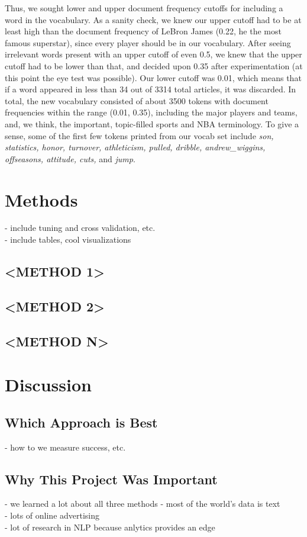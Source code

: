 \documentclass[11pt]{article}
\begin{document}
Thus, we sought lower and upper document frequency cutoffs for including a word in the vocabulary.  As a sanity check, we knew our upper cutoff had to be at least high than the document frequency of LeBron James (0.22, he the most famous superstar), since every player should be in our vocabulary. After seeing irrelevant words present with an upper cutoff of even 0.5, we knew that the upper cutoff had to be lower than that, and decided upon 0.35 after experimentation (at this point the eye test was possible). Our lower cutoff was 0.01, which means that if a word appeared in less than 34 out of 3314 total articles, it was discarded.  In total, the new vocabulary consisted of about 3500 tokens with document frequencies within the range (0.01, 0.35), including the major players and teams, and, we think, the important, topic-filled sports and NBA terminology. To give a sense, some of the first few tokens printed from our vocab set include \textit{son, statistics, honor, turnover, athleticism, pulled, dribble, andrew\_wiggins, offseasons, attitude, cuts,} and \textit{jump}.  


\section{Methods}
- include tuning and cross validation, etc. \\
- include tables, cool visualizations \\

\subsection{<METHOD 1>}

\subsection{<METHOD 2>}

\subsection{<METHOD N>}



\section{Discussion}
\subsection{Which Approach is Best}
- how to we measure success, etc.

\subsection{Why This Project Was Important}
- we learned a lot about all three methods
- most of the world's data is text \\
- lots of online advertising \\
- lot of research in NLP because anlytics provides an edge \\
\end{document}
